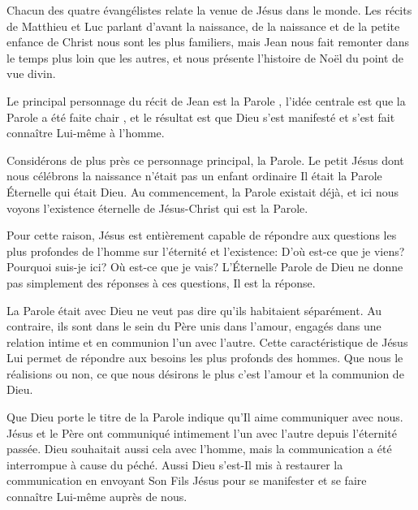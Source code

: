 

Chacun des quatre évangélistes relate la venue de Jésus dans le monde. Les récits de Matthieu et Luc parlant d'avant la naissance, de la naissance et de la petite enfance de Christ nous sont les plus familiers, mais Jean nous fait remonter dans le temps plus loin que les autres, et nous présente l'histoire de Noël du point de vue divin.

Le principal personnage du récit de Jean est \og la Parole \fg{}, l'idée centrale est que \og la Parole a été faite chair \fg{}, et le résultat est que Dieu s'est manifesté et s'est fait connaître Lui-même à l'homme.

Considérons de plus près ce personnage principal, la Parole. Le petit Jésus dont nous célébrons la naissance n'était pas un enfant ordinaire \ocadr Il était la Parole Éternelle qui était Dieu. Au commencement, la Parole existait déjà, et ici nous voyons l'existence éternelle de Jésus-Christ qui est la Parole.

Pour cette raison, Jésus est entièrement capable de répondre aux questions les plus profondes de l'homme sur l'éternité et l'existence: D'où est-ce que je viens? Pourquoi suis-je ici? Où est-ce que je vais? L'Éternelle Parole de Dieu ne donne pas simplement des réponses à ces questions, Il est la réponse.

\og La Parole était avec Dieu \fg{} ne veut pas dire qu'ils habitaient séparément. Au contraire, ils sont dans le sein du Père \ocadr unis dans l'amour, engagés dans une relation intime et en communion l'un avec l'autre. Cette caractéristique de Jésus Lui permet de répondre aux besoins les plus profonds des hommes. Que nous le réalisions ou non, ce que nous désirons le plus c'est l'amour et la communion de Dieu.

Que Dieu porte le titre de \og la Parole \fg{} indique qu'Il aime communiquer avec nous. Jésus et le Père ont communiqué intimement l'un avec l'autre depuis l'éternité passée. Dieu souhaitait aussi cela avec l'homme, mais la communication a été interrompue à cause du péché. Aussi Dieu s'est-Il mis à restaurer la communication en envoyant Son Fils Jésus pour se manifester et se faire connaître Lui-même auprès de nous.

